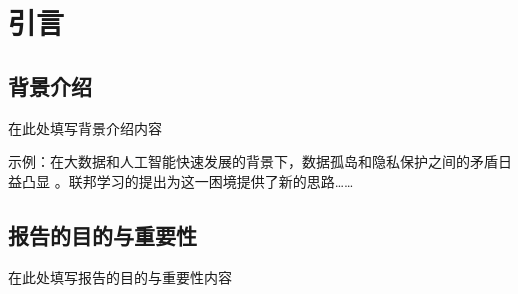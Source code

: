 \section{引言}
\subsection{背景介绍}
在此处填写背景介绍内容

示例：在大数据和人工智能快速发展的背景下，数据孤岛和隐私保护之间的矛盾日益凸显
\cite{mcmahan2017communication}。联邦学习的提出为这一困境提供了新的思路……

\subsection{报告的目的与重要性}

在此处填写报告的目的与重要性内容
